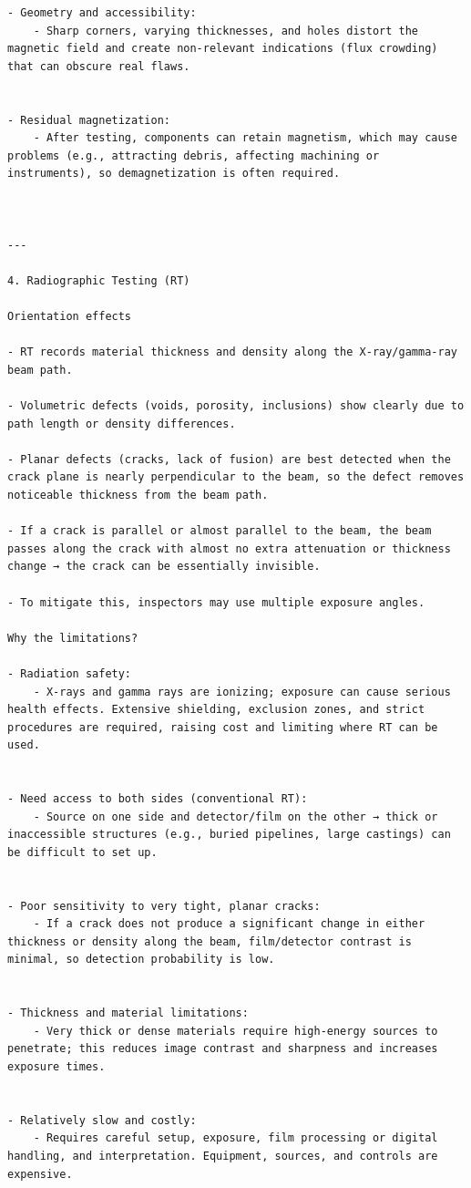\documentclass[11pt]{article}
\begin{document}
\begin{verbatim}
- Geometry and accessibility:
	- Sharp corners, varying thicknesses, and holes distort the magnetic field and create non-relevant indications (flux crowding) that can obscure real flaws.


- Residual magnetization:
	- After testing, components can retain magnetism, which may cause problems (e.g., attracting debris, affecting machining or instruments), so demagnetization is often required.



---

4. Radiographic Testing (RT)

Orientation effects

- RT records material thickness and density along the X‑ray/gamma‑ray beam path.

- Volumetric defects (voids, porosity, inclusions) show clearly due to path length or density differences.

- Planar defects (cracks, lack of fusion) are best detected when the crack plane is nearly perpendicular to the beam, so the defect removes noticeable thickness from the beam path.

- If a crack is parallel or almost parallel to the beam, the beam passes along the crack with almost no extra attenuation or thickness change → the crack can be essentially invisible.

- To mitigate this, inspectors may use multiple exposure angles.

Why the limitations?

- Radiation safety:
	- X‑rays and gamma rays are ionizing; exposure can cause serious health effects. Extensive shielding, exclusion zones, and strict procedures are required, raising cost and limiting where RT can be used.


- Need access to both sides (conventional RT):
	- Source on one side and detector/film on the other → thick or inaccessible structures (e.g., buried pipelines, large castings) can be difficult to set up.


- Poor sensitivity to very tight, planar cracks:
	- If a crack does not produce a significant change in either thickness or density along the beam, film/detector contrast is minimal, so detection probability is low.


- Thickness and material limitations:
	- Very thick or dense materials require high-energy sources to penetrate; this reduces image contrast and sharpness and increases exposure times.


- Relatively slow and costly:
	- Requires careful setup, exposure, film processing or digital handling, and interpretation. Equipment, sources, and controls are expensive.




\end{verbatim}
\end{document}
